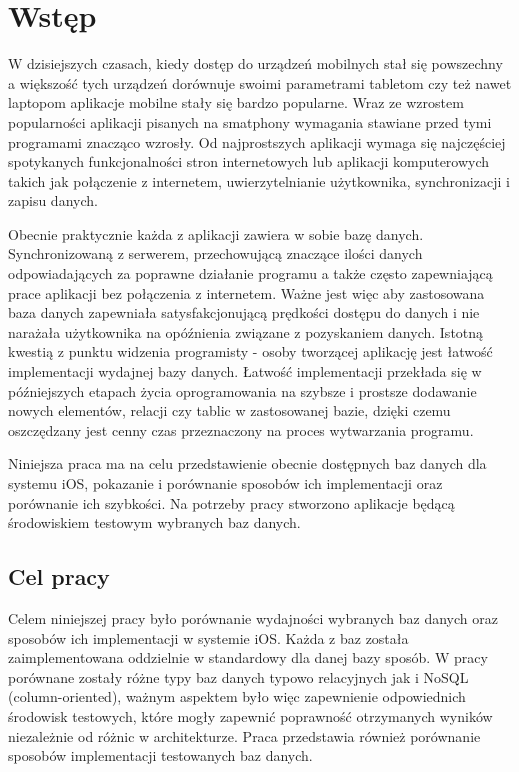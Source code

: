 \section{Wstęp}

W dzisiejszych czasach, kiedy dostęp do urządzeń mobilnych stał się powszechny a większość tych urządzeń dorównuje swoimi parametrami tabletom czy też nawet laptopom aplikacje mobilne stały się bardzo popularne. Wraz ze wzrostem popularności aplikacji pisanych na smatphony wymagania stawiane przed tymi programami znacząco wzrosły. Od najprostszych aplikacji wymaga się najczęściej spotykanych funkcjonalności stron internetowych lub aplikacji komputerowych takich jak połączenie z internetem, uwierzytelnianie użytkownika, synchronizacji i zapisu danych. \nocite{Swift-doc} \nocite{Realm-doc} \nocite{FMDB-doc} \nocite{CoreData-doc} \nocite{PorownanieRealm} \nocite{Mockaroo} \nocite{PorownanieDrDobbs} \nocite{SQLite-book} \nocite{CoreDataBook} \nocite{Art2Key} \nocite{Art3Key} \nocite{Art4Key}
\par
Obecnie praktycznie każda z aplikacji zawiera w sobie bazę danych. Synchronizowaną z serwerem, przechowującą znaczące ilości danych odpowiadających za poprawne działanie programu a także często zapewniającą prace aplikacji bez połączenia z internetem. Ważne jest więc aby zastosowana baza danych zapewniała satysfakcjonującą prędkości dostępu do danych i nie narażała użytkownika na opóźnienia związane z pozyskaniem danych. Istotną kwestią z punktu widzenia programisty - osoby tworzącej aplikację jest łatwość implementacji wydajnej bazy danych. Łatwość implementacji przekłada się w późniejszych etapach życia oprogramowania na szybsze i prostsze dodawanie nowych elementów, relacji czy tablic w zastosowanej bazie, dzięki czemu oszczędzany jest cenny czas przeznaczony na proces wytwarzania programu. \par

Niniejsza praca ma na celu przedstawienie obecnie dostępnych baz danych dla systemu iOS, pokazanie i porównanie  sposobów ich implementacji oraz porównanie ich szybkości. Na potrzeby pracy stworzono aplikacje będącą środowiskiem testowym wybranych baz danych. 
	
\subsection{Cel pracy}

Celem niniejszej pracy było porównanie wydajności wybranych baz danych oraz sposobów ich implementacji w systemie iOS. Każda z baz została zaimplementowana oddzielnie w standardowy dla danej bazy sposób. W pracy porównane zostały różne typy baz danych typowo relacyjnych jak i NoSQL (column-oriented), ważnym aspektem było więc zapewnienie odpowiednich środowisk testowych, które mogły zapewnić poprawność otrzymanych wyników niezależnie od różnic w architekturze. Praca przedstawia również porównanie sposobów implementacji testowanych baz danych.\par

